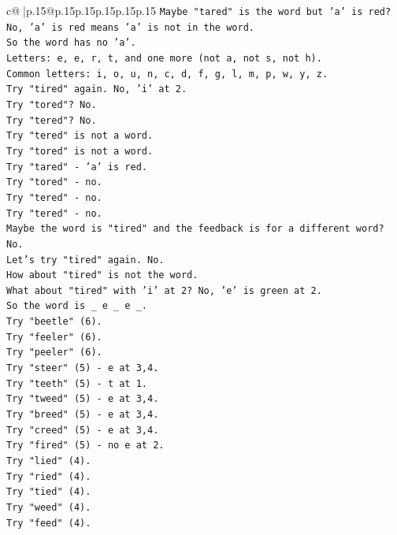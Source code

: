 \documentclass{article}
\begin{document}
{\begin{supertabular}{c@{$\;$}|p{.15\linewidth}@{}p{.15\linewidth}p{.15\linewidth}p{.15\linewidth}p{.15\linewidth}p{.15\linewidth}}
{{{\texttt{Maybe "tared" is the word but 'a' is red? No, 'a' is red means 'a' is not in the word.} \\
\texttt{So the word has no 'a'.} \\
\texttt{Letters: e, e, r, t, and one more (not a, not s, not h).} \\
\texttt{Common letters: i, o, u, n, c, d, f, g, l, m, p, w, y, z.} \\
\texttt{Try "tired" again. No, 'i' at 2.} \\
\texttt{Try "tored"? No.} \\
\texttt{Try "tered"? No.} \\
\texttt{Try "tered" is not a word.} \\
\texttt{Try "tored" is not a word.} \\
\texttt{Try "tared" {-} 'a' is red.} \\
\texttt{Try "tored" {-} no.} \\
\texttt{Try "tered" {-} no.} \\
\texttt{Try "tered" {-} no.} \\
\texttt{Maybe the word is "tired" and the feedback is for a different word? No.} \\
\texttt{Let's try "tired" again. No.} \\
\texttt{How about "tired" is not the word.} \\
\texttt{What about "tired" with 'i' at 2? No, 'e' is green at 2.} \\
\texttt{So the word is \_ e \_ e \_.} \\
\texttt{Try "beetle" (6).} \\
\texttt{Try "feeler" (6).} \\
\texttt{Try "peeler" (6).} \\
\texttt{Try "steer" (5) {-} e at 3,4.} \\
\texttt{Try "teeth" (5) {-} t at 1.} \\
\texttt{Try "tweed" (5) {-} e at 3,4.} \\
\texttt{Try "breed" (5) {-} e at 3,4.} \\
\texttt{Try "creed" (5) {-} e at 3,4.} \\
\texttt{Try "fired" (5) {-} no e at 2.} \\
\texttt{Try "lied" (4).} \\
\texttt{Try "ried" (4).} \\
\texttt{Try "tied" (4).} \\
\texttt{Try "weed" (4).} \\
\texttt{Try "feed" (4).} \\
}}}
\end{supertabular}}
\end{document}
